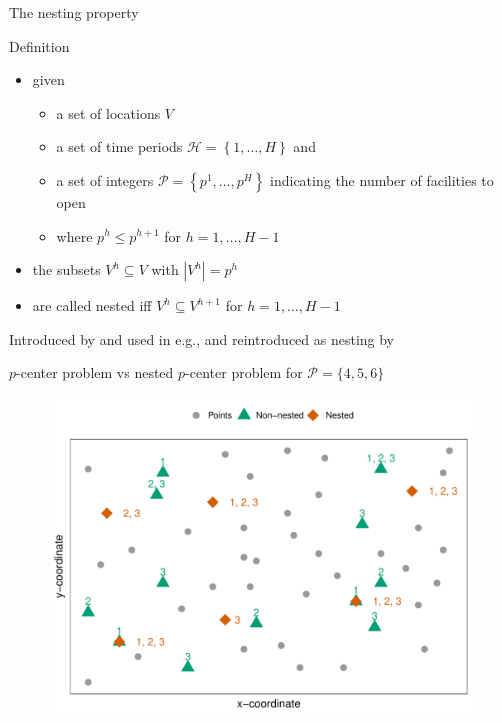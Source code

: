 \documentclass[utf8,aspectratio=1610,ngerman,english]{beamer}
\renewcommand{\emph}[1]{\textcolor{jkuGreen}{#1}}
\begin{document}
\begin{frame}{The nesting property}
    \begin{block}{Definition}
        \begin{itemize}
            \item given
                  \begin{itemize}
                      \item a set of locations $V$ \pause
                      \item a set of time periods $\mathcal{H} = \left\{1, \dots, H\right\}$ and \pause
                      \item a set of integers $\mathcal P = \left\{p^1, \dots, p^H\right\}$ indicating the number of facilities to open \pause
                      \item where $p^h \leq p^{h+1}$ for $h = 1, \dots, H-1$ \pause
                  \end{itemize}
            \item the subsets $V^h \subseteq V$ with $|V^h| = p^h$ \pause
            \item are called \emph{nested} iff $V^h  \subseteq V^{h+1}$ for $h = 1, \dots, H-1$
        \end{itemize}
    \end{block}\pause
    Introduced by \cite{Roodman1975} and used in e.g., \cite{albareda2009multi,conforti2014integer,bakker2024value} and reintroduced as nesting by \cite{McGarvey2022}
\end{frame}

\begin{frame}{$p$-center problem vs nested $p$-center problem for $\mathcal P = \{4, 5, 6\}$}
    \centering
    \begin{figure}
        \includegraphics[width=0.55\linewidth]{images/Rplot01.pdf}
    \end{figure}
\end{frame}
\end{document}

